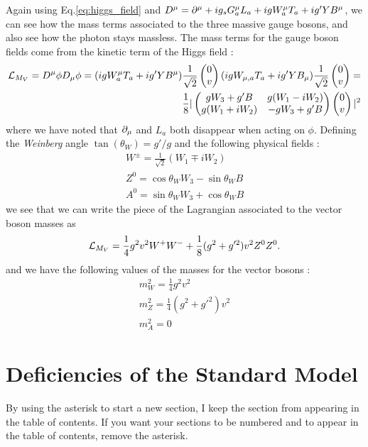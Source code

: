 Again using Eq.\ref{eq:higgs_field} and $D^\mu = \partial^\mu + ig_s G^\mu_a L_a + i g W^\mu_a T_a + i g' Y B^\mu $, we can see how the mass terms associated to the three massive gauge bosons, and also see how the photon stays massless.
The mass terms for the gauge boson fields come from the kinetic term of the Higgs field :
\begin{equation}
\begin{aligned}
\mathcal{L}_{M_V} = D^\mu \phi D_\mu \phi = (i g W^\mu_a T_a + i g' Y B^\mu ) \frac{1}{\sqrt{2}}\begin{pmatrix} 0 \\ v \end{pmatrix} (i g W_{\mu,a} T_a + i g' Y B_\mu ) \frac{1}{\sqrt{2}}\begin{pmatrix} 0 \\ v \end{pmatrix} = \\
\frac{1}{8} |\begin{pmatrix} gW_3 + g'B & g(W_1 - iW_2) \\ g(W_1 + iW_2) & -gW_3 + g'B \end{pmatrix}  \begin{pmatrix} 0 \\ v \end{pmatrix} |^2
\end{aligned}
\end{equation}
where we have noted that $\partial_\mu$ and $L_a$ both disappear when acting on $\phi$.
Defining the \textit{Weinberg} angle $\tan(\theta_W) = g'/g$ and the following physical fields :
\begin{equation}
\begin{aligned}
W^{\pm} = \frac{1}{\sqrt{2}}(W_1 \mp iW_2) \\
Z^0 = \cos \theta_W W_3 - \sin\theta_W B \\
A^0 = \sin \theta_W W_3 + \cos\theta_W B
\end{aligned}
\end{equation}
we see that we can write the piece of the Lagrangian associated to the vector boson masses as
\begin{equation}
\mathcal{L}_{M_V} = \frac{1}{4} g^2 v^2 W^+ W^- + \frac{1}{8} (g^2 + g'^2)v^2 Z^0 Z^0 .
\end{equation}
and we have the following values of the masses for the vector bosons :
\begin{equation}
\begin{aligned}
m_W^2 = \frac{1}{4} g^2 v^2 \\
m_Z^2 = \frac{1}{4} (g^2 + g'^2) v^2 \\
m_A^2 = 0
\end{aligned}
\end{equation}

\section{Deficiencies of the Standard Model}

By using the asterisk to start a new section, I keep the section from appearing in the table of contents.
If you want your sections to be numbered and to appear in the table of contents, remove the asterisk.
